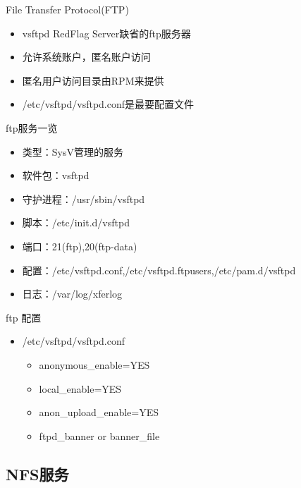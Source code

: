 \begin{frame}{File Transfer Protocol(FTP)}
\begin{itemize}
\item vsftpd RedFlag Server缺省的ftp服务器
\item 允许系统账户，匿名账户访问
\item 匿名用户访问目录由RPM来提供
\item /etc/vsftpd/vsftpd.conf是最要配置文件
\end{itemize}

\end{frame} 
\begin{frame}{ftp服务一览}


\begin{itemize}
\item 类型：SysV管理的服务
\item 软件包：vsftpd
\item 守护进程：/usr/sbin/vsftpd
\item 脚本：/etc/init.d/vsftpd
\item 端口：21(ftp),20(ftp-data)
\item 配置：/etc/vsftpd.conf,/etc/vsftpd.ftpusers,/etc/pam.d/vsftpd
\item 日志：/var/log/xferlog
\end{itemize}

\end{frame} 
\begin{frame}{ftp 配置}
\begin{itemize}
\item /etc/vsftpd/vsftpd.conf

\begin{itemize}
\item anonymous\_enable=YES
\item local\_enable=YES
\item anon\_upload\_enable=YES
\item ftpd\_banner or banner\_file
\end{itemize}
\end{itemize}

\end{frame} 
\subsection{NFS服务}


